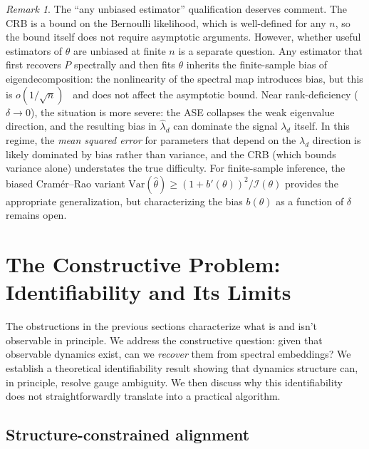 \documentclass{article}
\theoremstyle{plain}
\theoremstyle{definition}
\theoremstyle{remark}
\newtheorem*{remark}{Remark}
\begin{document}
\begin{remark}
The ``any unbiased estimator'' qualification deserves comment.
The CRB is a bound on the Bernoulli likelihood, which is well-defined for any $n$, so the bound itself does not require asymptotic arguments.
However, whether useful estimators of $\theta$ are unbiased at finite $n$ is a separate question.
Any estimator that first recovers $P$ spectrally and then fits $\theta$ inherits the finite-sample bias of eigendecomposition: the nonlinearity of the spectral map introduces bias, but this is $o(1/\sqrt{n})$~\citep{cape2019two} and does not affect the asymptotic bound.
Near rank-deficiency ($\delta \to 0$), the situation is more severe: the ASE collapses the weak eigenvalue direction, and the resulting bias in $\hat{\lambda}_d$ can dominate the signal $\lambda_d$ itself.
In this regime, the \emph{mean squared error} for parameters that depend on the $\lambda_d$ direction is likely dominated by bias rather than variance, and the CRB (which bounds variance alone) understates the true difficulty.
For finite-sample inference, the biased Cram\'er--Rao variant $\mathrm{Var}(\hat{\theta}) \ge (1 + b'(\theta))^2 / \mathcal{I}(\theta)$ provides the appropriate generalization, but characterizing the bias $b(\theta)$ as a function of $\delta$ remains open.
\end{remark}




\section{The Constructive Problem: Identifiability and Its Limits}\label{sec:constructive}

The obstructions in the previous sections characterize what is and isn't observable in principle.
We address the constructive question: given that observable dynamics exist, can we \emph{recover} them from spectral embeddings?
We establish a theoretical identifiability result showing that dynamics structure can, in principle, resolve gauge ambiguity.
We then discuss why this identifiability does not straightforwardly translate into a practical algorithm.

\subsection{Structure-constrained alignment}
\end{document}
